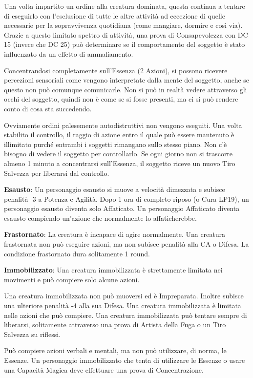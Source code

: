 \documentclass[a4paper,11pt,twoside,openany]{book}
\begin{document}
Una volta impartito un ordine alla creatura dominata, questa continua a tentare di eseguirlo con l'esclusione di tutte le altre attività ad eccezione di quelle necessarie per la sopravvivenza quotidiana (come mangiare, dormire e così via). Grazie a questo limitato spettro di attività, una prova di Consapevolezza con DC 15 (invece che DC 25) può determinare se il comportamento del soggetto è stato influenzato da un effetto di ammaliamento.

Concentrandosi completamente sull'Essenza (2 Azioni), si possono ricevere percezioni sensoriali come vengono interpretate dalla mente del soggetto, anche se questo non può comunque comunicarle. Non si può in realtà vedere attraverso gli occhi del soggetto, quindi non è come se si fosse presenti, ma ci si può rendere conto di cosa sta succedendo.

Ovviamente ordini palesemente autodistruttivi non vengono eseguiti. Una volta stabilito il controllo, il raggio di azione entro il quale può essere mantenuto è illimitato purché entrambi i soggetti rimangano sullo stesso piano. Non c'è bisogno di vedere il soggetto per controllarlo. Se ogni giorno non si trascorre almeno 1 minuto a concentrarsi sull'Essenza, il soggetto riceve un nuovo Tiro Salvezza per liberarsi dal controllo.

\textbf{Esausto}: Un personaggio esausto si muove a velocità dimezzata e subisce penalità -3 a Potenza e Agilità. Dopo 1 ora di completo riposo (o Cura LP19), un personaggio esausto diventa solo Affaticato. Un personaggio Affaticato diventa esausto compiendo un'azione che normalmente lo affaticherebbe.

\textbf{Frastornato}: La creatura è incapace di agire normalmente.
Una creatura frastornata non può eseguire azioni, ma non subisce penalità alla CA o Difesa. La condizione frastornato dura solitamente 1 round.

\textbf{Immobilizzato}: Una creatura immobilizzata è strettamente limitata nei movimenti e può compiere solo alcune azioni.

Una creatura immobilizzata non può muoversi ed è Impreparata. Inoltre subisce una ulteriore penalità -4 alla sua Difesa. Una creatura immobilizzata è limitata nelle azioni che può compiere. Una creatura immobilizzata può tentare sempre di liberarsi, solitamente attraverso una prova di Artista della Fuga o un Tiro Salvezza su riflessi.

Può compiere azioni verbali e mentali, ma non può utilizzare, di norma, le Essenze. Un personaggio immobilizzato che tenta di utilizzare le Essenze o usare una Capacità Magica deve effettuare una prova di Concentrazione.
\end{document}
